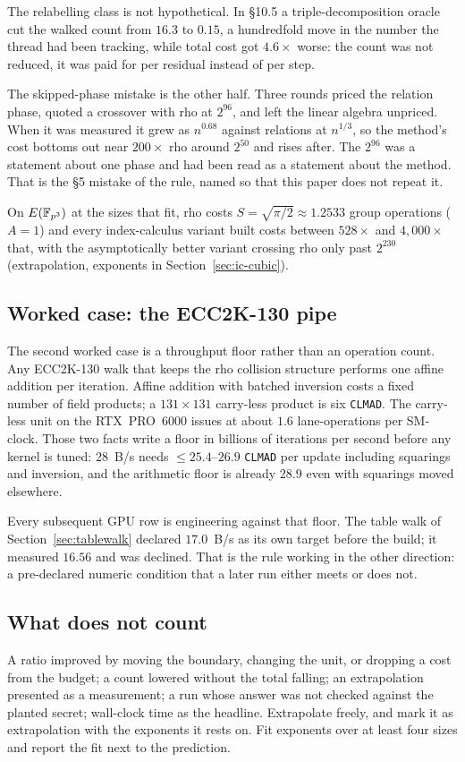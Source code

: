The relabelling class is not hypothetical. In §10.5 a
triple-decomposition oracle cut the walked count from $16.3$ to
$0.15$, a hundredfold move in the number the thread had been tracking,
while total cost got $4.6\times$ worse: the count was not reduced, it
was paid for per residual instead of per step.

The skipped-phase mistake is the other half. Three rounds priced the
relation phase, quoted a crossover with rho at $2^{96}$, and left the
linear algebra unpriced. When it was measured it grew as $n^{0.68}$
against relations at $n^{1/3}$, so the method's cost bottoms out near
$200\times$ rho around $2^{50}$ and rises after. The $2^{96}$ was a
statement about one phase and had been read as a statement about the
method. That is the §5 mistake of the rule, named so that this paper
does not repeat it.

On $E(\mathbb{F}_{p^3})$ at the sizes that fit, rho costs
$S=\sqrt{\pi/2}\approx 1.2533$ group operations ($A=1$) and
every index-calculus variant built costs between $528\times$ and
$4{,}000\times$ that, with the asymptotically better variant crossing
rho only past $2^{230}$ (extrapolation, exponents in
Section~\ref{sec:ic-cubic}).

\subsection{Worked case: the ECC2K-130 pipe}
\label{sec:method-pipe}

The second worked case is a throughput floor rather than an operation
count. Any ECC2K-130 walk that keeps the rho collision structure
performs one affine addition per iteration. Affine addition with
batched inversion costs a fixed number of field products; a $131\times
131$ carry-less product is six \texttt{CLMAD}. The carry-less unit on
the RTX~PRO~6000 issues at about $1.6$ lane-operations per SM-clock.
Those two facts write a floor in billions of iterations per second
before any kernel is tuned: $28$~B/s needs $\le 25.4$--$26.9$
\texttt{CLMAD} per update including squarings and inversion, and the
arithmetic floor is already $28.9$ even with squarings moved
elsewhere.

Every subsequent GPU row is engineering against that floor. The table
walk of Section~\ref{sec:tablewalk} declared $17.0$~B/s as its own
target before the build; it measured $16.56$ and was declined. That is
the rule working in the other direction: a pre-declared numeric
condition that a later run either meets or does not.

\subsection{What does not count}

A ratio improved by moving the boundary, changing the unit, or
dropping a cost from the budget; a count lowered without the total
falling; an extrapolation presented as a measurement; a run whose
answer was not checked against the planted secret; wall-clock time as
the headline. Extrapolate freely, and mark it as extrapolation with
the exponents it rests on. Fit exponents over at least four sizes and
report the fit next to the prediction.
